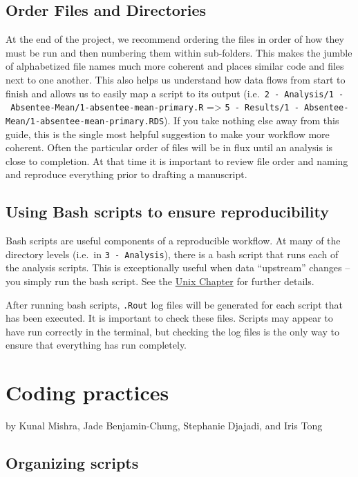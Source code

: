 \documentclass[
]{book}
\begin{document}
\section{Order Files and Directories}\label{order-files-and-directories}

At the end of the project, we recommend ordering the files in order of how they must be run and then numbering them within sub-folders. This makes the jumble of alphabetized file names much more coherent and places similar code and files next to one another. This also helps us understand how data flows from start to finish and allows us to easily map a script to its output (i.e.~\texttt{2\ -\ Analysis/1\ -\ Absentee-Mean/1-absentee-mean-primary.R} =\textgreater{} \texttt{5\ -\ Results/1\ -\ Absentee-Mean/1-absentee-mean-primary.RDS}). If you take nothing else away from this guide, this is the single most helpful suggestion to make your workflow more coherent. Often the particular order of files will be in flux until an analysis is close to completion. At that time it is important to review file order and naming and reproduce everything prior to drafting a manuscript.

\section{Using Bash scripts to ensure reproducibility}\label{using-bash-scripts-to-ensure-reproducibility}

Bash scripts are useful components of a reproducible workflow. At many of the directory levels (i.e.~in \texttt{3\ -\ Analysis}), there is a bash script that runs each of the analysis scripts. This is exceptionally useful when data ``upstream'' changes -- you simply run the bash script. See the \hyperref[unix]{Unix Chapter} for further details.

After running bash scripts, \texttt{.Rout} log files will be generated for each script that has been executed. It is important to check these files. Scripts may appear to have run correctly in the terminal, but checking the log files is the only way to ensure that everything has run completely.

\chapter{Coding practices}\label{coding-practices}

by Kunal Mishra, Jade Benjamin-Chung, Stephanie Djajadi, and Iris Tong

\section{Organizing scripts}\label{organizing-scripts}
\end{document}
